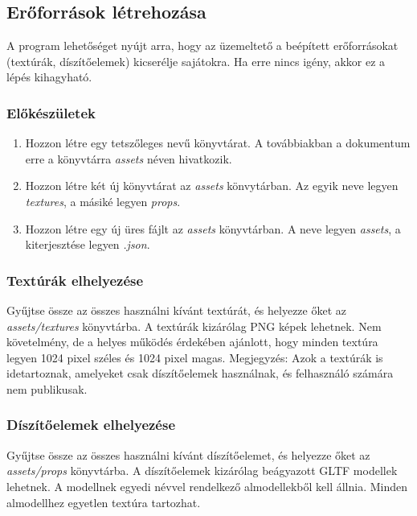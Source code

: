\subsection{Erőforrások létrehozása}
\label{kleng}

A program lehetőséget nyújt arra, hogy az üzemeltető a beépített erőforrásokat
(textúrák, díszítőelemek) kicserélje sajátokra. Ha erre nincs igény, akkor ez a lépés kihagyható.

\subsubsection{Előkészületek}

\begin{enumerate}
    \item Hozzon létre egy tetszőleges nevű könyvtárat. A továbbiakban a dokumentum erre a
          könyvtárra \emph{assets} néven hivatkozik.

    \item Hozzon létre két új könyvtárat az \emph{assets} könvytárban. Az egyik neve legyen
          \emph{textures}, a másiké legyen \emph{props}.

    \item Hozzon létre egy új üres fájlt az \emph{assets} könyvtárban. A neve legyen \emph{assets},
          a kiterjesztése legyen \emph{.json}.
\end{enumerate}

\subsubsection{Textúrák elhelyezése}

Gyűjtse össze az összes használni kívánt textúrát, és helyezze őket az \emph{assets/textures}
könyvtárba. A textúrák kizárólag PNG képek lehetnek. Nem követelmény, de a helyes működés érdekében
ajánlott, hogy minden textúra legyen 1024 pixel széles és 1024 pixel magas. Megjegyzés: Azok a
textúrák is idetartoznak, amelyeket csak díszítőelemek használnak, és felhasználó számára nem
publikusak.

\subsubsection{Díszítőelemek elhelyezése}

Gyűjtse össze az összes használni kívánt díszítőelemet, és helyezze őket az \emph{assets/props}
könyvtárba. A díszítőelemek kizárólag beágyazott GLTF modellek lehetnek. A modellnek egyedi
névvel rendelkező almodellekből kell állnia. Minden almodellhez egyetlen textúra tartozhat.


